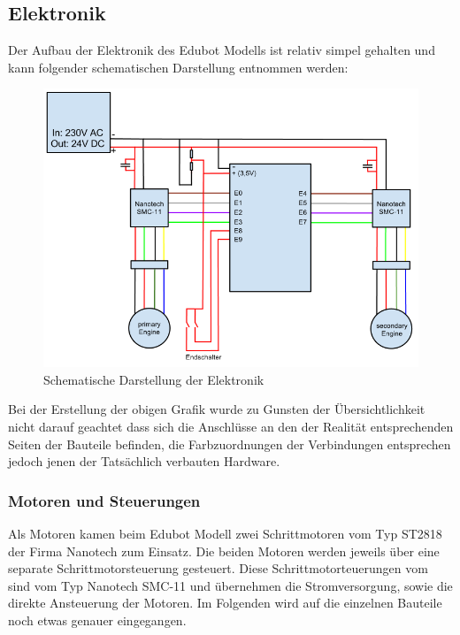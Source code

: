 \subsection{Elektronik}
Der Aufbau der Elektronik des Edubot Modells ist relativ simpel gehalten und kann folgender schematischen Darstellung entnommen werden:

\begin{figure}[H]
  \centering
  \begin{minipage}[t]{14 cm}
  	\centering
  	\includegraphics[width=14cm]{images/edubot_electronic} 
    \caption{Schematische Darstellung der Elektronik}
  \end{minipage}
\end{figure}

Bei der Erstellung der obigen Grafik wurde zu Gunsten der Übersichtlichkeit nicht darauf geachtet dass sich die Anschlüsse an den der Realität entsprechenden Seiten der Bauteile befinden, die Farbzuordnungen der Verbindungen entsprechen jedoch jenen der Tatsächlich verbauten Hardware.

\subsubsection{Motoren und Steuerungen}
Als Motoren kamen beim Edubot Modell zwei Schrittmotoren vom Typ ST2818 der Firma Nanotech zum Einsatz. Die beiden Motoren werden jeweils über eine separate Schrittmotorsteuerung gesteuert. Diese Schrittmotorteuerungen vom sind vom Typ Nanotech SMC-11 und übernehmen die Stromversorgung, sowie die direkte Ansteuerung der Motoren. Im Folgenden wird auf die einzelnen Bauteile noch etwas genauer eingegangen.

